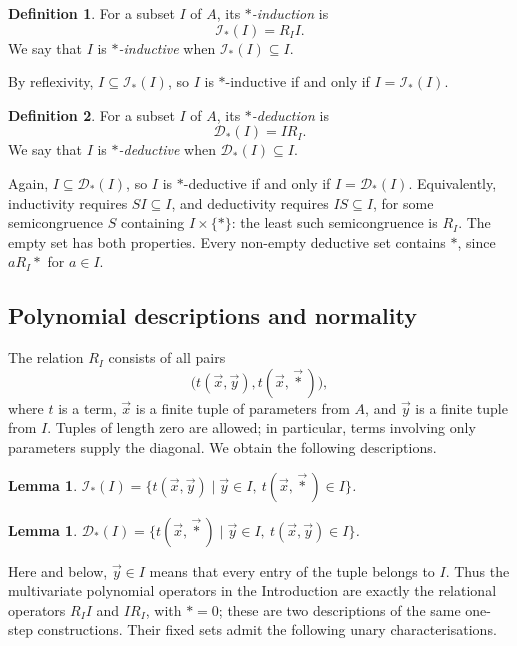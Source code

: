 \documentclass[12pt,english]{amsart}
\newtheorem{lemma}[theorem]{Lemma}
\theoremstyle{definition}
\newtheorem{definition}{Definition}[section]
\numberwithin{equation}{section}
\theoremstyle{remark}
\newcommand{\ind}[1]{\mathcal{I}_\top(#1)}
\newcommand{\ded}[1]{\mathcal{D}_\top(#1)}
\renewcommand{\top}{\ast}
\begin{document}
\begin{definition}
For a subset $I$ of $A$, its \emph{$\top$-induction} is
\[
\ind I=R_I I.
\]
We say that $I$ is \emph{$\top$-inductive} when $\ind I\subseteq I$.
\end{definition}

By reflexivity, $I\subseteq\ind I$, so $I$ is $\top$-inductive if and only if $I=\ind I$.

\begin{definition}
For a subset $I$ of $A$, its \emph{$\top$-deduction} is
\[
\ded I=I R_I.
\]
We say that $I$ is \emph{$\top$-deductive} when $\ded I\subseteq I$.
\end{definition}

Again, $I\subseteq\ded I$, so $I$ is $\top$-deductive if and only if $I=\ded I$. Equivalently, inductivity requires $SI\subseteq I$, and deductivity requires $IS\subseteq I$, for some semicongruence $S$ containing $I\times\{\top\}$: the least such semicongruence is $R_I$. The empty set has both properties. Every non-empty deductive set contains $\top$, since $aR_I\top$ for $a\in I$.

\subsection{Polynomial descriptions and normality}

The relation $R_I$ consists of all pairs
\[
\bigl(t(\vec x,\vec y),t(\vec x,\vec\top)\bigr),
\]
where $t$ is a term, $\vec x$ is a finite tuple of parameters from $A$, and $\vec y$ is a finite tuple from $I$. Tuples of length zero are allowed; in particular, terms involving only parameters supply the diagonal. We obtain the following descriptions.

\begin{lemma}\label{LemA}
$\ind I=\{t(\vec x,\vec y)\mid \vec y\in I,\ t(\vec x,\vec\top)\in I\}$.
\end{lemma}

\begin{lemma}\label{LemB}
$\ded I=\{t(\vec x,\vec\top)\mid \vec y\in I,\ t(\vec x,\vec y)\in I\}$.
\end{lemma}

Here and below, $\vec y\in I$ means that every entry of the tuple belongs to $I$. Thus the multivariate polynomial operators in the Introduction are exactly the relational operators $R_I I$ and $I R_I$, with $\top=0$; these are two descriptions of the same one-step constructions. Their fixed sets admit the following unary characterisations.
\end{document}
